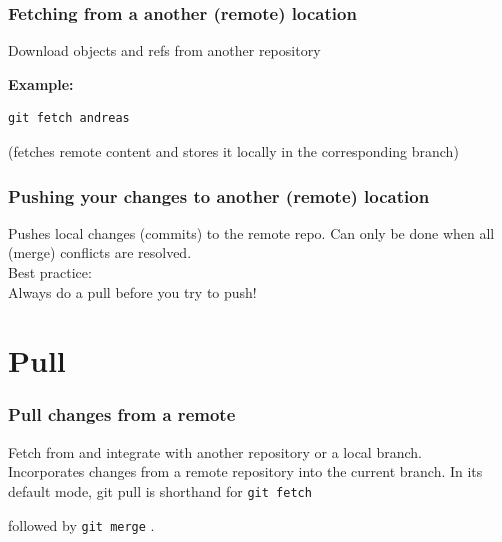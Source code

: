 \documentclass{gittalk}
\newcommand{\hlcommand}[1]{ %
\colorbox{base3}{\small \texttt{#1}}
}
\begin{document}
\begin{frame}[fragile]
\frametitle{Fetching from a another (remote) location}
\begin{tcolorbox}[title=git fetch]
Download objects and refs from another repository
\end{tcolorbox}
\vspace*{1em}
\textbf{Example:}
\begin{lstlisting}
git fetch andreas
\end{lstlisting}
(fetches remote content and stores it locally in the corresponding branch)
\end{frame}

\begin{frame}
\frametitle{Pushing your changes to another (remote) location}
\begin{tcolorbox}[title=git push]
Pushes local changes (commits) to the remote repo. Can only be done when all
(merge) conflicts are resolved.\\[0.5em]
Best practice:\\
Always do a pull before you try to push!
\end{tcolorbox}
\end{frame}

\section{Pull}

\begin{frame}[fragile]
\frametitle{Pull changes from a remote}
\begin{tcolorbox}[title=git pull]
Fetch from and integrate with another repository or a local
branch.\\[0.5em]
Incorporates changes from a remote repository into the current branch.
In its default mode, git pull is shorthand for \hlcommand{git fetch}
followed by \hlcommand{git merge}.
\end{tcolorbox}
\end{frame}
\end{document}
